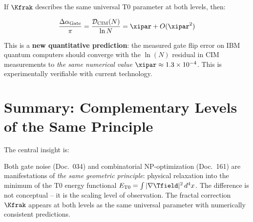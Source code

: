 If $\Kfrak$ describes the same universal T0 parameter at both levels, then:

\begin{equation}
    \frac{\Delta\alpha_{\text{Gate}}}{\pi} = \frac{\mathcal{D}_{\text{CIM}}(N)}{\ln N}
    = \xipar + O(\xipar^2)
    \label{eq:universal_kfrak}
\end{equation}

This is a \textbf{new quantitative prediction}: the measured gate flip error on IBM
quantum computers should converge with the $\ln(N)$ residual in CIM measurements to
\emph{the same numerical value} $\xipar \approx 1.3 \times 10^{-4}$.
This is experimentally verifiable with current technology.

\clearpage

\section{Summary: Complementary Levels of the Same Principle}
\label{sec:summary}

\begin{table}[h]
    \centering
    \caption{Full synthesis: both documents as complementary T0 levels}
    \label{tab:synthesis}
\end{table}

The central insight is:

\begin{revolutionary}
    Both gate noise (Doc.\ 034) and combinatorial NP-optimization (Doc.\ 161) are
    manifestations of \emph{the same geometric principle}: physical relaxation into
    the minimum of the T0 energy functional
    $E_{\text{T0}} = \int |\nabla \Tfield|^2 \, d^4x$.
    The difference is not conceptual -- it is the scaling level of observation.
    The fractal correction $\Kfrak$ appears at both levels as the same universal
    parameter with numerically consistent predictions.
\end{revolutionary}

